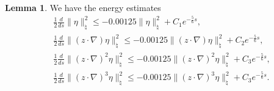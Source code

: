 \documentclass[11pt,reqno]{amsart}
\theoremstyle{definition}
\theoremstyle{bfremark}
\newtheorem{lemma}{Lemma}[section]
\numberwithin{equation}{section}
\begin{document}
\begin{lemma}
\label{lem:energy estim z 1}
    We have the energy estimates
    \begin{align}
    &\frac{1}{2}\frac{d}{ds}\|\eta\|_{\natural}^2 \leq -0.00125\|\eta\|_{\natural}^2+C_1e^{-\frac{5}{6}s}, \label{inq:int2 energy 1}\\
    &\frac{1}{2}\frac{d}{ds}\|(z \cdot \nabla)\eta\|_{\natural}^2 \leq -0.00125\|(z \cdot \nabla)\eta\|_{\natural}^2+C_2e^{-\frac{5}{6}s},\label{inq:int2 energy 2}\\
    &\frac{1}{2}\frac{d}{ds}\|(z \cdot \nabla)^2\eta\|_{\natural}^2 \leq -0.00125\|(z \cdot \nabla)^2\eta\|_{\natural}^2+C_3e^{-\frac{5}{6}s},\label{inq:int2 energy 3}\\
    &\frac{1}{2}\frac{d}{ds}\|(z \cdot \nabla)^3\eta\|_{\natural}^2 \leq -0.00125\|(z \cdot \nabla)^3\eta\|_{\natural}^2+C_3e^{-\frac{5}{6}s}.\label{inq:int2 energy 4}
    \end{align}
\end{lemma}
\end{document}
